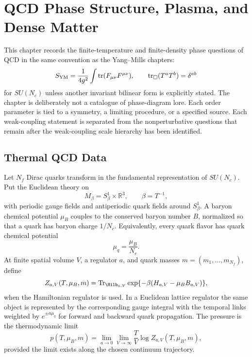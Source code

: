 \chapter{QCD Phase Structure, Plasma, and Dense Matter}
\label{ch:qcd-phase-structure-plasma-dense-matter}

\ConventionsMixed

This chapter records the finite-temperature and finite-density phase
questions of QCD in the same convention as the Yang--Mills chapters:
\[
  S_{\rm YM}
  =
  \frac{1}{4g^2}\int\operatorname{tr}(F_{\mu\nu}F^{\mu\nu}),
  \qquad
  \operatorname{tr}_{\square}(T^aT^b)=\delta^{ab}
\]
for \(SU(N_c)\) unless another invariant bilinear form is explicitly stated.
The chapter is deliberately not a catalogue of phase-diagram lore.  Each
order parameter is tied to a symmetry, a limiting procedure, or a specified
source.  Each weak-coupling statement is separated from the nonperturbative
questions that remain after the weak-coupling scale hierarchy has been
identified.

\section{Thermal QCD Data}

Let \(N_f\) Dirac quarks transform in the fundamental representation of
\(SU(N_c)\).  Put the Euclidean theory on
\[
  M_\beta=S^1_\beta\times \mathbb R^3,
  \qquad
  \beta=T^{-1},
\]
with periodic gauge fields and antiperiodic quark fields around
\(S^1_\beta\).  A baryon chemical potential \(\mu_B\) couples to the
conserved baryon number \(B\), normalized so that a quark has baryon charge
\(1/N_c\).  Equivalently, every quark flavor has quark chemical potential
\[
  \mu_q=\frac{\mu_B}{N_c}.
\]
At finite spatial volume \(V\), a regulator \(a\), and quark masses
\(m=(m_1,\ldots,m_{N_f})\), define
\begin{equation}
  Z_{a,V}(T,\mu_B,m)
  =
  \operatorname{Tr}_{\Hilb_{a,V}}
  \exp\{-\beta(H_{a,V}-\mu_B B_{a,V})\},
  \label{eq:qcd-phase-finite-volume-partition}
\end{equation}
when the Hamiltonian regulator is used.  In a Euclidean lattice regulator
the same object is represented by the corresponding gauge integral with the
temporal links weighted by \(e^{\pm a\mu_q}\) for forward and backward quark
propagation.  The pressure is the thermodynamic limit
\begin{equation}
  p(T,\mu_B,m)
  =
  \lim_{a\to0}\lim_{V\to\infty}
  \frac{T}{V}\log Z_{a,V}(T,\mu_B,m),
  \label{eq:qcd-pressure-definition}
\end{equation}
provided the limit exists along the chosen continuum trajectory.

